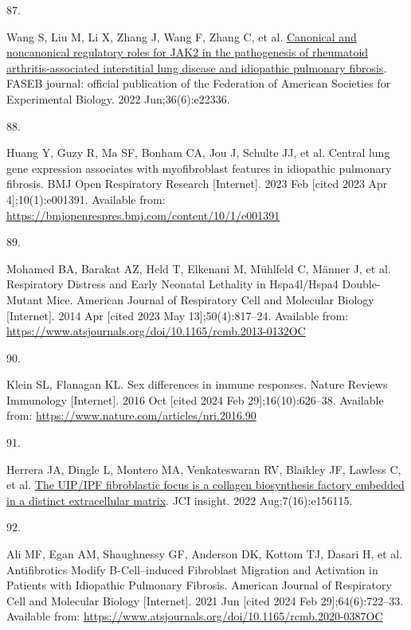 \documentclass[
]{article}
\newlength{\cslhangindent}
\newlength{\csllabelwidth}
\newlength{\cslentryspacingunit} %
\newenvironment{CSLReferences}[2] %
 {%
  \setlength{\parindent}{0pt}
  \ifodd #1
  \let\oldpar\par
  \def\par{\hangindent=\cslhangindent\oldpar}
  \fi
  \setlength{\parskip}{#2\cslentryspacingunit}
 }%
 {}
\newcommand{\CSLLeftMargin}[1]{\parbox[t]{\csllabelwidth}{#1}}
\newcommand{\CSLRightInline}[1]{\parbox[t]{\linewidth - \csllabelwidth}{#1}\break}
\begin{document}
\begin{CSLReferences}{0}{0}
\leavevmode{}%
\CSLLeftMargin{87. }%
\CSLRightInline{Wang S, Liu M, Li X, Zhang J, Wang F, Zhang C, et al. \href{https://doi.org/10.1096/fj.202101436R}{Canonical and noncanonical regulatory roles for {JAK2} in the pathogenesis of rheumatoid arthritis-associated interstitial lung disease and idiopathic pulmonary fibrosis}. FASEB journal: official publication of the Federation of American Societies for Experimental Biology. 2022 Jun;36(6):e22336. }

\leavevmode{}%
\CSLLeftMargin{88. }%
\CSLRightInline{Huang Y, Guzy R, Ma SF, Bonham CA, Jou J, Schulte JJ, et al. Central lung gene expression associates with myofibroblast features in idiopathic pulmonary fibrosis. BMJ Open Respiratory Research {[}Internet{]}. 2023 Feb {[}cited 2023 Apr 4{]};10(1):e001391. Available from: \url{https://bmjopenrespres.bmj.com/content/10/1/e001391}}

\leavevmode{}%
\CSLLeftMargin{89. }%
\CSLRightInline{Mohamed BA, Barakat AZ, Held T, Elkenani M, Mühlfeld C, Männer J, et al. Respiratory {Distress} and {Early} {Neonatal} {Lethality} in {Hspa4l}/{Hspa4} {Double}-{Mutant} {Mice}. American Journal of Respiratory Cell and Molecular Biology {[}Internet{]}. 2014 Apr {[}cited 2023 May 13{]};50(4):817--24. Available from: \url{https://www.atsjournals.org/doi/10.1165/rcmb.2013-0132OC}}

\leavevmode{}%
\CSLLeftMargin{90. }%
\CSLRightInline{Klein SL, Flanagan KL. Sex differences in immune responses. Nature Reviews Immunology {[}Internet{]}. 2016 Oct {[}cited 2024 Feb 29{]};16(10):626--38. Available from: \url{https://www.nature.com/articles/nri.2016.90}}

\leavevmode{}%
\CSLLeftMargin{91. }%
\CSLRightInline{Herrera JA, Dingle L, Montero MA, Venkateswaran RV, Blaikley JF, Lawless C, et al. \href{https://doi.org/10.1172/jci.insight.156115}{The {UIP}/{IPF} fibroblastic focus is a collagen biosynthesis factory embedded in a distinct extracellular matrix}. JCI insight. 2022 Aug;7(16):e156115. }

\leavevmode{}%
\CSLLeftMargin{92. }%
\CSLRightInline{Ali MF, Egan AM, Shaughnessy GF, Anderson DK, Kottom TJ, Dasari H, et al. Antifibrotics {Modify} {B}-{Cell}--induced {Fibroblast} {Migration} and {Activation} in {Patients} with {Idiopathic} {Pulmonary} {Fibrosis}. American Journal of Respiratory Cell and Molecular Biology {[}Internet{]}. 2021 Jun {[}cited 2024 Feb 29{]};64(6):722--33. Available from: \url{https://www.atsjournals.org/doi/10.1165/rcmb.2020-0387OC}}


\end{CSLReferences}
\end{document}
